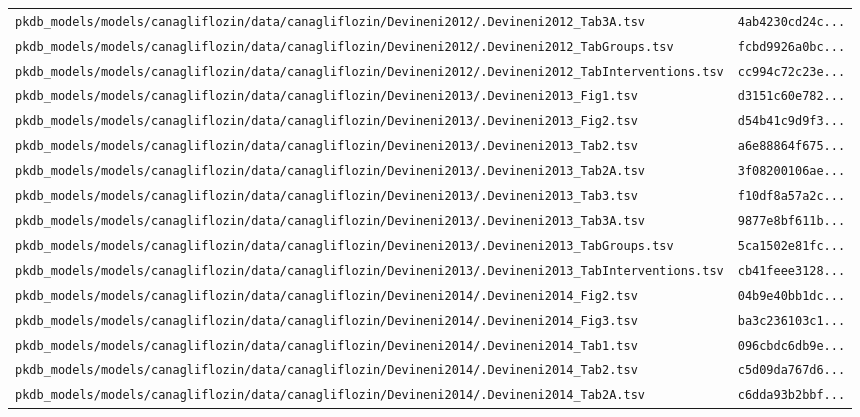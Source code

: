 \begin{longtable}{ll}
\texttt{pkdb\_models/models/canagliflozin/data/canagliflozin/Devineni2012/.Devineni2012\_Tab3A.tsv} & \texttt{4ab4230cd24c...} \\
\texttt{pkdb\_models/models/canagliflozin/data/canagliflozin/Devineni2012/.Devineni2012\_TabGroups.tsv} & \texttt{fcbd9926a0bc...} \\
\texttt{pkdb\_models/models/canagliflozin/data/canagliflozin/Devineni2012/.Devineni2012\_TabInterventions.tsv} & \texttt{cc994c72c23e...} \\
\texttt{pkdb\_models/models/canagliflozin/data/canagliflozin/Devineni2013/.Devineni2013\_Fig1.tsv} & \texttt{d3151c60e782...} \\
\texttt{pkdb\_models/models/canagliflozin/data/canagliflozin/Devineni2013/.Devineni2013\_Fig2.tsv} & \texttt{d54b41c9d9f3...} \\
\texttt{pkdb\_models/models/canagliflozin/data/canagliflozin/Devineni2013/.Devineni2013\_Tab2.tsv} & \texttt{a6e88864f675...} \\
\texttt{pkdb\_models/models/canagliflozin/data/canagliflozin/Devineni2013/.Devineni2013\_Tab2A.tsv} & \texttt{3f08200106ae...} \\
\texttt{pkdb\_models/models/canagliflozin/data/canagliflozin/Devineni2013/.Devineni2013\_Tab3.tsv} & \texttt{f10df8a57a2c...} \\
\texttt{pkdb\_models/models/canagliflozin/data/canagliflozin/Devineni2013/.Devineni2013\_Tab3A.tsv} & \texttt{9877e8bf611b...} \\
\texttt{pkdb\_models/models/canagliflozin/data/canagliflozin/Devineni2013/.Devineni2013\_TabGroups.tsv} & \texttt{5ca1502e81fc...} \\
\texttt{pkdb\_models/models/canagliflozin/data/canagliflozin/Devineni2013/.Devineni2013\_TabInterventions.tsv} & \texttt{cb41feee3128...} \\
\texttt{pkdb\_models/models/canagliflozin/data/canagliflozin/Devineni2014/.Devineni2014\_Fig2.tsv} & \texttt{04b9e40bb1dc...} \\
\texttt{pkdb\_models/models/canagliflozin/data/canagliflozin/Devineni2014/.Devineni2014\_Fig3.tsv} & \texttt{ba3c236103c1...} \\
\texttt{pkdb\_models/models/canagliflozin/data/canagliflozin/Devineni2014/.Devineni2014\_Tab1.tsv} & \texttt{096cbdc6db9e...} \\
\texttt{pkdb\_models/models/canagliflozin/data/canagliflozin/Devineni2014/.Devineni2014\_Tab2.tsv} & \texttt{c5d09da767d6...} \\
\texttt{pkdb\_models/models/canagliflozin/data/canagliflozin/Devineni2014/.Devineni2014\_Tab2A.tsv} & \texttt{c6dda93b2bbf...} \\

\end{longtable}
